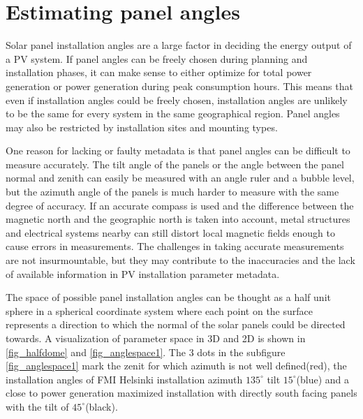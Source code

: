 \chapter{Estimating panel angles}
Solar panel installation angles are a large factor in deciding the energy output of a PV system. If panel angles can be freely chosen during planning and installation phases, it can make sense to either optimize for total power generation or power generation during peak consumption hours. This means that even if installation angles could be freely chosen, installation angles are unlikely to be the same for every system in the same geographical region. Panel angles may also be restricted by installation sites and mounting types. 


One reason for lacking or faulty metadata is that panel angles can be difficult to measure accurately. The tilt angle of the panels or the angle between the panel normal and zenith can easily be measured with an angle ruler and a bubble level, but the azimuth angle of the panels is much harder to measure with the same degree of accuracy. If an accurate compass is used and the difference between the magnetic north and the geographic north is taken into account, metal structures and electrical systems nearby can still distort local magnetic fields enough to cause errors in measurements. The challenges in taking accurate measurements are not insurmountable, but they may contribute to the inaccuracies and the lack of available information in PV installation parameter metadata. 

The space of possible panel installation angles can be thought as a half unit sphere in a spherical coordinate system where each point on the surface represents a direction to which the normal of the solar panels could be directed towards. A visualization of parameter space in 3D and 2D is shown in \ref{fig_halfdome} and \ref{fig_anglespace1}. The 3 dots in the subfigure \ref{fig_anglespace1} mark the zenit for which azimuth is not well defined(red), the installation angles of FMI Helsinki installation azimuth $135^\circ$ tilt $15^\circ$(blue) and a close to power generation maximized installation with directly south facing panels with the tilt of $45^\circ$(black).


